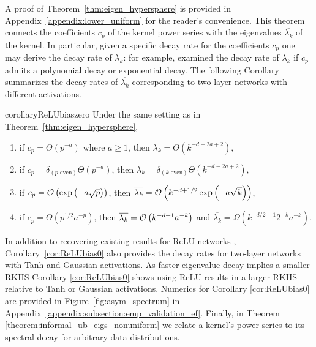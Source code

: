 A proof of Theorem~\ref{thm:eigen_hypersphere} is provided in Appendix~\ref{appendix:lower_uniform} for the reader's convenience. This theorem connects the coefficients $c_p$ of the kernel power series with the eigenvalues $\overline{\lambda_k}$ of the kernel. In particular, given a specific decay rate for the coefficients $c_p$ one may derive the decay rate of $\overline{\lambda_k}$: for example, \cite{scetbon2021spectral} examined the decay rate of $\overline{\lambda_k}$ if $c_p$ admits a polynomial decay or exponential decay. The following Corollary summarizes the decay rates of $\overline{\lambda_k}$ corresponding to two layer networks with different activations.
\begin{restatable}{corollary}{ReLUbiaszero}\label{cor:ReLUbias0}
Under the same setting as in Theorem~\ref{thm:eigen_hypersphere}, 
\begin{enumerate}
    \item if $c_p = \Theta(p^{-a})$ where $a\geq 1$, then $\overline{\lambda_k} = \Theta(k^{-d-2a+2})$, 
    \item if $c_p = \delta_{(p \text{ even})} \Theta(p^{-a})$, then $\overline{\lambda_k} = \delta_{(k \text{ even})}\Theta(k^{-d-2a+2})$, 
    \item if $c_p = \mathcal{O}\left(\exp\left( - a\sqrt{p}\right) \right)$, then $\overline{\lambda_k} = \mathcal{O}\left(k^{-d+1/2}\exp\left( - a\sqrt{k}\right) \right)$, 
    \item if $c_p = \Theta(p^{1/2} a^{-p})$, then $\overline{\lambda_k} = \mathcal{O}\left(k^{-d+1}a^{-k} \right)$ and $\overline{\lambda_k} =\Omega\left(k^{-d/2+1}2^{-k}a^{-k} \right)$. 
\end{enumerate}
\end{restatable} 
In addition to recovering existing results for ReLU networks \cite{uniform_sphere_data, NEURIPS2021_14faf969, geifman2020similarity, bietti2021deep}, Corollary~\ref{cor:ReLUbias0} also provides the decay rates for two-layer networks with Tanh and Gaussian activations. As faster eigenvalue decay implies a smaller RKHS Corollary \ref{cor:ReLUbias0} shows using ReLU results in a larger RKHS relative to Tanh or Gaussian activations. Numerics for Corollary \ref{cor:ReLUbias0} are provided in Figure~\ref{fig:asym_spectrum} in Appendix~\ref{appendix:subsection:emp_validation_ef}. Finally, in Theorem \ref{theorem:informal_ub_eigs_nonuniform} we relate a kernel's power series to its spectral decay for arbitrary data distributions. 


